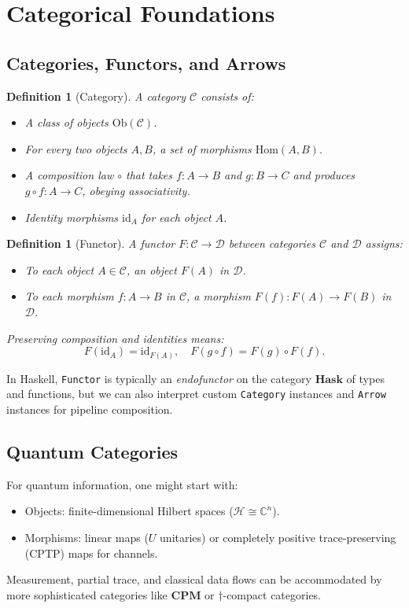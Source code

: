 \documentclass[12pt]{article}
\newtheorem{definition}[theorem]{Definition}
\begin{document}
\section{Categorical Foundations}

\subsection{Categories, Functors, and Arrows}

\begin{definition}[Category]
A category \(\mathcal{C}\) consists of:
\begin{itemize}
\item A class of objects \(\mathrm{Ob}(\mathcal{C})\).
\item For every two objects \(A, B\), a set of morphisms
\(\mathrm{Hom}(A,B)\).
\item A composition law \(\circ\) that takes
\(f: A \to B\) and \(g: B \to C\) and produces \(g \circ f: A \to C\),
obeying associativity.
\item Identity morphisms \(\mathrm{id}_A\) for each object \(A\).
\end{itemize}
\end{definition}

\begin{definition}[Functor]
A functor \(F: \mathcal{C} \to \mathcal{D}\) between categories
\(\mathcal{C}\) and \(\mathcal{D}\) assigns:
\begin{itemize}
\item To each object \(A \in \mathcal{C}\), an object \(F(A)\) in
\(\mathcal{D}\).
\item To each morphism \(f: A \to B\) in \(\mathcal{C}\), a morphism
\(F(f): F(A) \to F(B)\) in \(\mathcal{D}\).
\end{itemize}
Preserving composition and identities means:
\[
F(\mathrm{id}_A) = \mathrm{id}_{F(A)}, \quad
F(g \circ f) = F(g) \circ F(f).
\]
\end{definition}

In Haskell, \texttt{Functor} is typically an \emph{endofunctor}
on the category \(\mathbf{Hask}\) of types and functions, but
we can also interpret custom \texttt{Category} instances and
\texttt{Arrow} instances for pipeline composition.

\subsection{Quantum Categories}
For quantum information, one might start with:
\begin{itemize}
\item Objects: finite-dimensional Hilbert spaces
(\(\mathcal{H} \cong \mathbb{C}^n\)).
\item Morphisms: linear maps (\(U\) unitaries) or
completely positive trace-preserving (CPTP) maps for channels.
\end{itemize}
Measurement, partial trace, and classical data flows can be
accommodated by more sophisticated categories like \(\mathbf{CPM}\)
or \(\dagger\)-compact categories.
\end{document}
